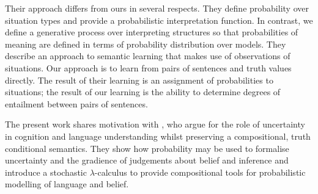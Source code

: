 \documentclass[a4paper,11pt]{article}
\renewcommand{\cite}{\citep}
\theoremstyle{definition}
\begin{document}
Their approach differs from ours in several respects. They define probability over situation types and provide a probabilistic interpretation function. In contrast, we define a generative process over interpreting structures so that probabilities of meaning are defined in terms of probability distribution over models. They describe an approach to semantic learning that makes use of observations of situations. Our approach is to learn from pairs of sentences and truth values directly. The result of their learning is an assignment of probabilities to situations; the result of our learning is the ability to determine degrees of entailment between pairs of sentences. 

The present work shares motivation with \cite{Goodman:14}, who argue for the role of uncertainty in cognition and language understanding whilst preserving a compositional, truth conditional semantics. They show how probability may be used to formalise uncertainty and the gradience of judgements about belief and inference and introduce a stochastic $\lambda$-calculus to provide compositional tools for probabilistic modelling of language and belief. 
\end{document}
